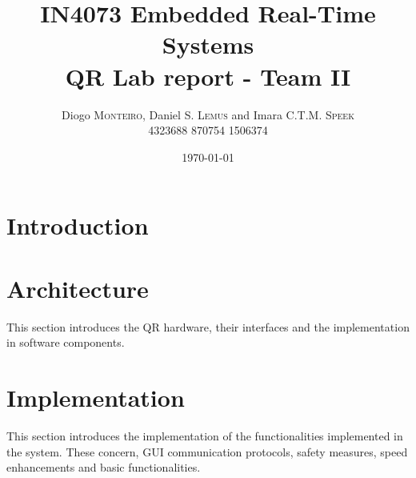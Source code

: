 \documentclass{article}
\title{IN4073 Embedded Real-Time Systems \\ QR Lab report - Team II} %
\author{Diogo \textsc{Monteiro}, Daniel S. \textsc{Lemus} and Imara C.T.M. \textsc{Speek} \\
		4323688 870754 1506374} %
\date{\today} %
\begin{document}
\maketitle %

 \begin{abstract}


 \end{abstract}


\section{Introduction}
\label{sec:introduction}



\section{Architecture}
\label{sec:architecture}

This section introduces the QR hardware, their interfaces and the implementation in software components. 



\section{Implementation}
\label{sec:implementation}

This section introduces the implementation of the functionalities implemented in the system. These concern, GUI communication protocols, safety measures, speed enhancements and basic functionalities.


\end{document}
